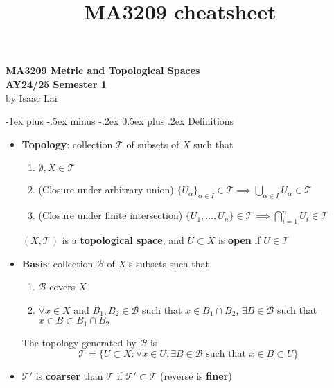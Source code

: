 \documentclass[frenchspacing,9pt,landscape,a4paper]{article}
\title{MA3209 cheatsheet}
\makeatletter
\renewcommand{\section}{\@startsection{section}{1}{0mm}%
                                {-1ex plus -.5ex minus -.2ex}%
                                {0.5ex plus .2ex}%
                                {\normalfont\large\bfseries}}
\theoremstyle{remark}
\makeatother
\begin{document}
\raggedright
\footnotesize

\begin{multicols}{4} %
\setlength{\premulticols}{1pt}
\setlength{\postmulticols}{1pt}
\setlength{\multicolsep}{1pt}
\setlength{\columnsep}{2pt}
\begin{mdframed}
\begin{center}
    \large{\textbf{MA3209 Metric and Topological Spaces}} \\
    \normalsize{\textbf{AY24/25 Semester 1}}\\
    \small{by Isaac Lai}
\end{center}	
\end{mdframed}
\section{Definitions}
\begin{itemize}
    \item \textbf{Topology}: collection  $\mathcal{T}$ of subsets of  $X$ such that
     \begin{enumerate}
         \item $\emptyset,X\in\mathcal{T}$
         \item  (Closure under arbitrary union) $\{U_\alpha\}_{\alpha\in I}\in\mathcal{T}\implies\bigcup_{\alpha\in
             I}U_\alpha\in\mathcal{T}$
         \item (Closure under finite intersection)  $\{U_1,\dots,U_n\}\in\mathcal{T}\implies\bigcap_{i=1}^n
             U_i\in\mathcal{T}$
     \end{enumerate} $(X,\mathcal{T})$ is a \textbf{topological space}, and  $U\subset X$ is \textbf{open}
     if  $U\in\mathcal{T}$
 \item \textbf{Basis}: collection  $\mathcal{B}$ of  $X$'s subsets such that
     \begin{enumerate}
         \item $\mathcal{B}$ covers  $X$
         \item  $\forall x\in X$ and  $B_1,B_2\in\mathcal{B}$ such that $x\in B_1\cap B_2$, $\exists
             B\in\mathcal{B}$ such that  $x\in B\subset B_1\cap B_2$
     \end{enumerate} The topology generated by $\mathcal{B}$ is  
     \[\mathcal{T}=\{U\subset X:\forall x\in U,\exists B\in\mathcal{B}\text{ such that }x\in B\subset U\}\]
 \item $\mathcal{T}'$ is \textbf{coarser} than  $\mathcal{T}$ if  $\mathcal{T}'\subset\mathcal{T}$ (reverse
     is \textbf{finer})

\end{itemize}
\end{multicols}
\end{document}

